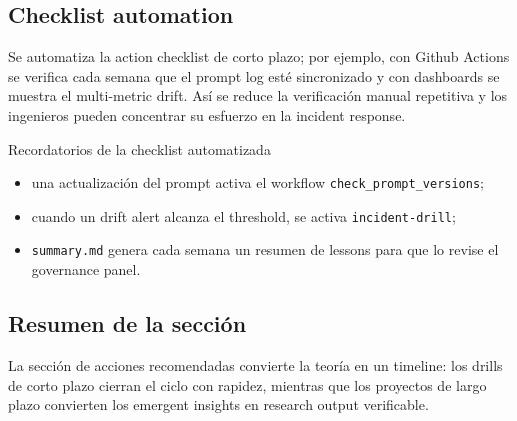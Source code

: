 \subsection{Checklist automation}

Se automatiza la action checklist de corto plazo; por ejemplo, con Github Actions se verifica cada semana que el prompt log esté sincronizado y con dashboards se muestra el multi-metric drift. Así se reduce la verificación manual repetitiva y los ingenieros pueden concentrar su esfuerzo en la incident response.

\begin{importantbox}{Recordatorios de la checklist automatizada}
\begin{itemize}
    \item una actualización del prompt activa el workflow \texttt{check\_prompt\_versions};
    \item cuando un drift alert alcanza el threshold, se activa \texttt{incident-drill};
    \item \texttt{summary.md} genera cada semana un resumen de lessons para que lo revise el governance panel.
\end{itemize}
\end{importantbox}

\subsection{Resumen de la sección}

La sección de acciones recomendadas convierte la teoría en un timeline: los drills de corto plazo cierran el ciclo con rapidez, mientras que los proyectos de largo plazo convierten los emergent insights en research output verificable.
